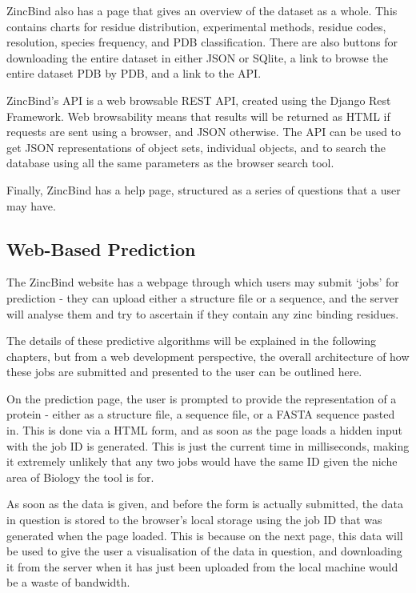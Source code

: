 ZincBind also has a page that gives an overview of the dataset as a whole. This contains charts for residue distribution, experimental methods, residue codes, resolution, species frequency, and PDB classification. There are also buttons for downloading the entire dataset in either JSON or SQlite, a link to browse the entire dataset PDB by PDB, and a link to the API.

ZincBind's API is a web browsable REST API, created using the Django Rest Framework. Web browsability means that results will be returned as HTML if requests are sent using a browser, and JSON otherwise. The API can be used to get JSON representations of object sets, individual objects, and to search the database using all the same parameters as the browser search tool.

Finally, ZincBind has a help page, structured as a series of questions that a user may have.

\subsection{Web-Based Prediction}

The ZincBind website has a webpage through which users may submit `jobs' for prediction - they can upload either a structure file or a sequence, and the server will analyse them and try to ascertain if they contain any zinc binding residues.

The details of these predictive algorithms will be explained in the following chapters, but from a web development perspective, the overall architecture of how these jobs are submitted and presented to the user can be outlined here.

On the prediction page, the user is prompted to provide the representation of a protein - either as a structure file, a sequence file, or a FASTA sequence pasted in. This is done via a HTML form, and as soon as the page loads a hidden input with the job ID is generated. This is just the current time in milliseconds, making it extremely unlikely that any two jobs would have the same ID given the niche area of Biology the tool is for.

As soon as the data is given, and before the form is actually submitted, the data in question is stored to the browser's local storage using the job ID that was generated when the page loaded. This is because on the next page, this data will be used to give the user a visualisation of the data in question, and downloading it from the server when it has just been uploaded from the local machine would be a waste of bandwidth.


